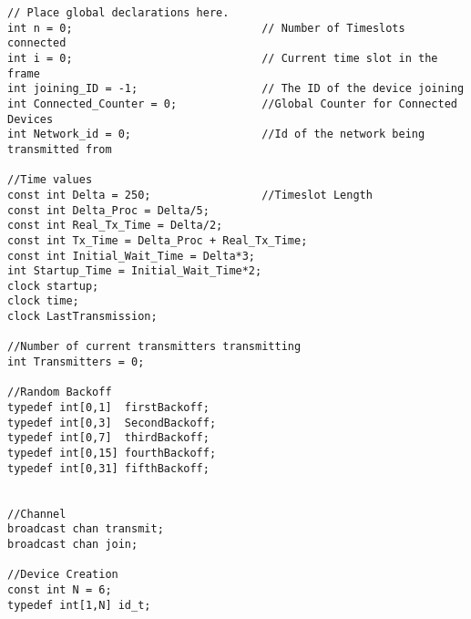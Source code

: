 \begin{lstlisting}[style=UPPAAL,
caption={Code for the global declarations in CCUC}]
// Place global declarations here.
int n = 0;                             // Number of Timeslots connected
int i = 0;                             // Current time slot in the frame
int joining_ID = -1;                   // The ID of the device joining       
int Connected_Counter = 0;             //Global Counter for Connected Devices
int Network_id = 0;                    //Id of the network being transmitted from

//Time values
const int Delta = 250;                 //Timeslot Length
const int Delta_Proc = Delta/5;
const int Real_Tx_Time = Delta/2;
const int Tx_Time = Delta_Proc + Real_Tx_Time;
const int Initial_Wait_Time = Delta*3;
int Startup_Time = Initial_Wait_Time*2;
clock startup;
clock time;
clock LastTransmission;

//Number of current transmitters transmitting
int Transmitters = 0;

//Random Backoff
typedef int[0,1]  firstBackoff;
typedef int[0,3]  SecondBackoff;
typedef int[0,7]  thirdBackoff;
typedef int[0,15] fourthBackoff;
typedef int[0,31] fifthBackoff;


//Channel
broadcast chan transmit;
broadcast chan join;

//Device Creation
const int N = 6;
typedef int[1,N] id_t;
\end{lstlisting}
